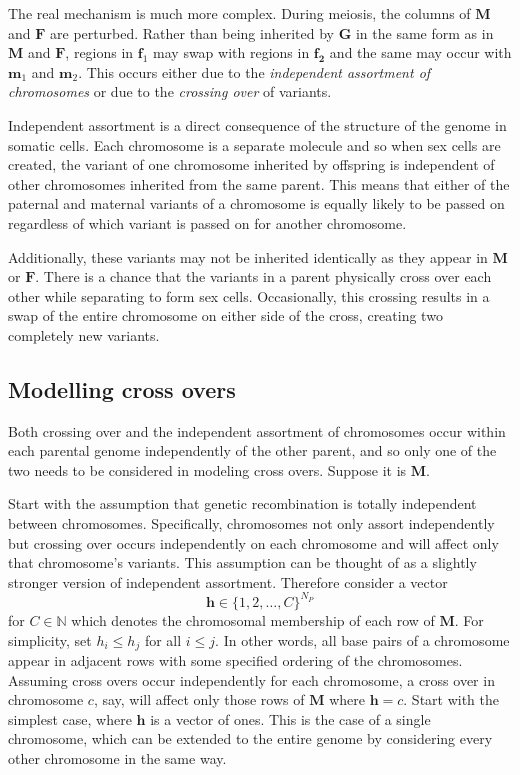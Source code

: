\documentclass[12pt]{article}
\newcommand{\ve}[1]{\mathbf{#1}}           %
\newcommand{\m}[1]{\mathbf{#1}}               %
\newcommand{\field}[1]{\mathbb{#1}}
\newcommand{\Naturals}{\field{N}}
\begin{document}
The real mechanism is much more complex. During meiosis, the columns of $\m{M}$ and $\m{F}$ are perturbed. Rather than being inherited by $\m{G}$ in the same form as in $\m{M}$ and $\m{F}$, regions in $\ve{f}_1$ may swap with regions in $\ve{f_2}$ and the same may occur with $\ve{m}_1$ and $\ve{m}_2$. This occurs either due to the \emph{independent assortment of chromosomes} or due to the \emph{crossing over} of variants.

Independent assortment is a direct consequence of the structure of the genome in somatic cells. Each chromosome is a separate molecule and so when sex cells are created, the variant of one chromosome inherited by offspring is independent of other chromosomes inherited from the same parent. This means that either of the paternal and maternal variants of a chromosome is equally likely to be passed on regardless of which variant is passed on for another chromosome.

Additionally, these variants may not be inherited identically as they appear in $\m{M}$ or $\m{F}$. There is a chance that the variants in a parent physically cross over each other while separating to form sex cells. Occasionally, this crossing results in a swap of the entire chromosome on either side of the cross, creating two completely new variants.

\subsection{Modelling cross overs} \label{subsec:modelcrossing}

Both crossing over and the independent assortment of chromosomes occur within each parental genome independently of the other parent, and so only one of the two needs to be considered in modeling cross overs. Suppose it is $\m{M}$.

Start with the assumption that genetic recombination is totally independent between chromosomes. Specifically, chromosomes not only assort independently but crossing over occurs independently on each chromosome and will affect only that chromosome's variants. This assumption can be thought of as a slightly stronger version of independent assortment. Therefore consider a vector
$$\ve{h} \in \{1, 2, \dots, C\}^{N_P}$$
for $C \in \Naturals$ which denotes the chromosomal membership of each row of $\m{M}$. For simplicity, set $h_i \leq h_j$ for all $i \leq j$. In other words, all base pairs of a chromosome appear in adjacent rows with some specified ordering of the chromosomes. Assuming cross overs occur independently for each chromosome, a cross over in chromosome $c$, say, will affect only those rows of $\m{M}$ where $\ve{h} = c$. Start with the simplest case, where $\ve{h}$ is a vector of ones. This is the case of a single chromosome, which can be extended to the entire genome by considering every other chromosome in the same way.
\end{document}
